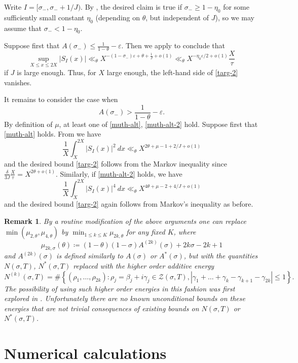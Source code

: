 \documentclass[12pt]{amsart}
\newtheorem*{remark*}{Remark}
\newcommand{\eps}{\varepsilon}
\begin{document}
Write $I = [\sigma_-,\sigma_-+1/J)$. By , the desired claim is true if $\sigma_- \geq 1-\eta_0$ for some sufficiently small constant $\eta_0$ (depending on $\theta$, but independent of $J$), so we may assume that $\sigma_- < 1-\eta_0$.

Suppose first that $A(\sigma_-) \leq \frac{1}{1-\theta}-\eps$.  Then we apply  to conclude that
$$
\sup_{X \leq x \leq 2X}|S_I(x)|
\ll_\theta X^{- (1-\sigma_-) \eps + \theta + \frac{1}{J} + o(1)} \ll_\theta X^{-\eta_0 \eps/2 + o(1)} \frac{X}{\tau}$$
if $J$ is large enough.  Thus, for $X$ large enough, the left-hand side of \eqref{targ-2} vanishes.

It remains to consider the case when
$$ A(\sigma_-) > \frac{1}{1-\theta}-\eps.$$
By definition of $\mu$, at least one of \eqref{muth-alt}, \eqref{muth-alt-2} hold.  Suppose first that \eqref{muth-alt} holds. From  we have
$$ \frac{1}{X}\int_X^{2X} |S_I(x)|^2\ dx \ll_\theta X^{2\theta + \mu - 1 + 2/J + o(1)}$$
and the desired bound \eqref{targ-2} follows from the Markov inequality since $\frac{\delta}{3J} \frac{X}{\tau} =X^{2\theta+o(1)}$.
Similarly, if \eqref{muth-alt-2} holds, we have
$$ \frac{1}{X}\int_X^{2X} |S_I(x)|^4\ dx \ll_\theta X^{4\theta + \mu - 2 + 4/J + o(1)}$$
and the desired bound \eqref{targ-2} again follows from Markov's inequality as before.

\begin{remark*}
By a routine modification of the above arguments one can replace $\min(\mu_{2,\theta}, \mu_{4,\theta})$ by $\min_{1 \leq k \leq K} \mu_{2k,\theta}$ for any fixed $K$, where
$$ \mu_{2k,\sigma}(\theta) \coloneqq (1-\theta)(1-\sigma) A^{(2k)}(\sigma) + 2k\sigma-2k+1$$
and $A^{(2k)}(\sigma)$ is defined similarly to $A(\sigma)$ or $A^*(\sigma)$, but with the quantities $N(\sigma,T)$, $N^*(\sigma,T)$ replaced with the higher order additive energy
$$N^{(k)}(\sigma, T) =  \#\left\{ (\rho_1, \dots, \rho_{2k}) : \rho_j = \beta_j + i\gamma_j\in \mathcal{Z}(\sigma, T), |\gamma_1 +\dots+ \gamma_k - \gamma_{k+1} - \gamma_{2k}|\le1 \right\}.$$
The possibility of using such higher order energies in this fashion was first explored in \cite{baz-3}.  Unfortunately there are no known unconditional bounds on these energies that are not trivial consequences of existing bounds on $N(\sigma,T)$ or $N^*(\sigma,T)$.\end{remark*}

\section{Numerical calculations}\label{numerics-sec}
\end{document}
